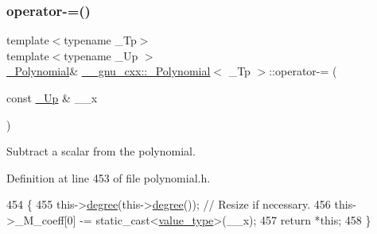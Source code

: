 \subsubsection{\texorpdfstring{operator-\/=()}{operator-=()}\hspace{0.1cm}{\footnotesize\ttfamily [1/2]}}
{\footnotesize\ttfamily template$<$typename \+\_\+\+Tp$>$ \\
template$<$typename \+\_\+\+Up $>$ \\
\hyperlink{class____gnu__cxx_1_1__Polynomial}{\+\_\+\+Polynomial}\& \hyperlink{class____gnu__cxx_1_1__Polynomial}{\+\_\+\+\_\+gnu\+\_\+cxx\+::\+\_\+\+Polynomial}$<$ \+\_\+\+Tp $>$\+::operator-\/= (\begin{DoxyParamCaption}\item[{const \hyperlink{class____gnu__cxx_1_1__Polynomial_a242114d4b86648a5dff67a8221f80d40}{\+\_\+\+Up} \&}]{\+\_\+\+\_\+x }\end{DoxyParamCaption})\hspace{0.3cm}{\ttfamily [inline]}}

Subtract a scalar from the polynomial. 

Definition at line 453 of file polynomial.\+h.


\begin{DoxyCode}
454         \{
455           this->\hyperlink{class____gnu__cxx_1_1__Polynomial_a07d9933aeeb9afbd823218ed921336cb}{degree}(this->\hyperlink{class____gnu__cxx_1_1__Polynomial_a07d9933aeeb9afbd823218ed921336cb}{degree}()); \textcolor{comment}{// Resize if necessary.}
456           this->\_M\_coeff[0] -= \textcolor{keyword}{static\_cast<}\hyperlink{class____gnu__cxx_1_1__Polynomial_a725563351f50e76084a7a016c06f8a53}{value\_type}\textcolor{keyword}{>}(\_\_x);
457           \textcolor{keywordflow}{return} *\textcolor{keyword}{this};
458         \}
\end{DoxyCode}
\mbox{\label{class____gnu__cxx_1_1__Polynomial_af092dce5f209610ec20ea84ccfe0a5f1}} 
